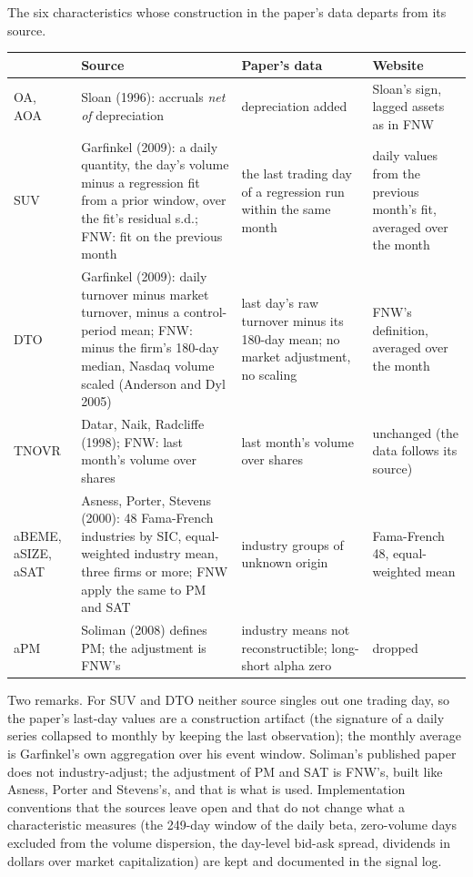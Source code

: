 \documentclass[11pt]{article}
\begin{document}
\begin{tbl}{The six characteristics whose construction in the paper's data departs from its source.}
\begin{tabular}{>{\raggedright\arraybackslash}p{1.7cm}>{\raggedright\arraybackslash}p{4.4cm}>{\raggedright\arraybackslash}p{4.2cm}>{\raggedright\arraybackslash}p{3.9cm}}\toprule
 & Source & Paper's data & Website\\\midrule
OA, AOA & Sloan (1996): accruals \emph{net of} depreciation & depreciation added & Sloan's sign, lagged assets as in FNW\\[2pt]
SUV & Garfinkel (2009): a daily quantity, the day's volume minus a regression fit from a prior window, over the fit's residual s.d.; FNW: fit on the previous month & the last trading day of a regression run within the same month & daily values from the previous month's fit, averaged over the month\\[2pt]
DTO & Garfinkel (2009): daily turnover minus market turnover, minus a control-period mean; FNW: minus the firm's 180-day median, Nasdaq volume scaled (Anderson and Dyl 2005) & last day's raw turnover minus its 180-day mean; no market adjustment, no scaling & FNW's definition, averaged over the month\\[2pt]
TNOVR & Datar, Naik, Radcliffe (1998); FNW: last month's volume over shares & last month's volume over shares & unchanged (the data follows its source)\\[2pt]
aBEME, aSIZE, aSAT & Asness, Porter, Stevens (2000): 48 Fama-French industries by SIC, equal-weighted industry mean, three firms or more; FNW apply the same to PM and SAT & 27 industry groups of unknown origin & Fama-French 48, equal-weighted mean\\[2pt]
aPM & Soliman (2008) defines PM; the adjustment is FNW's & industry means not reconstructible; long-short alpha zero & dropped\\
\bottomrule
\end{tabular}
\end{tbl}

Two remarks. For SUV and DTO neither source singles out one trading day, so
the paper's last-day values are a construction artifact (the signature of a
daily series collapsed to monthly by keeping the last observation); the
monthly average is Garfinkel's own aggregation over his event window.
Soliman's published paper does not industry-adjust; the adjustment of PM and
SAT is FNW's, built like Asness, Porter and Stevens's, and that is what is
used. Implementation conventions that the sources leave open and that do
not change what a characteristic measures (the 249-day window of the daily
beta, zero-volume days excluded from the volume dispersion, the day-level
bid-ask spread, dividends in dollars over market capitalization) are kept
and documented in the signal log.
\end{document}
